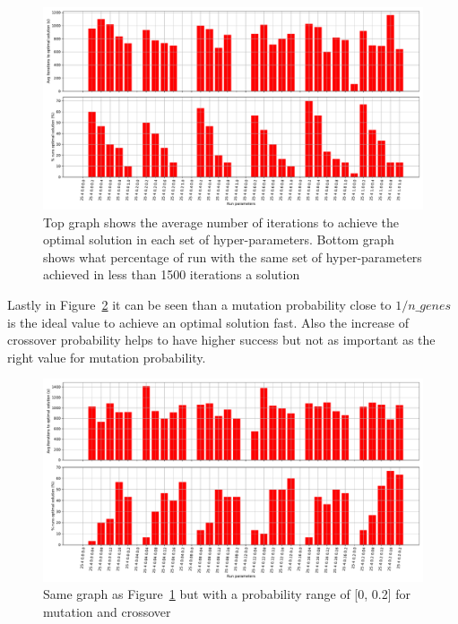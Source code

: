 \documentclass[12pt,oneside,a4paper]{article}
\begin{document}
    \begin{figure}[h]
        \includegraphics[width=\textwidth]{iters_to_optimal}
        \caption{Top graph shows the average number of iterations to achieve the optimal solution in each set of
        hyper-parameters.
        Bottom graph shows what percentage of run with the same set of hyper-parameters achieved in less than 1500
        iterations a solution}
        \label{fig:iters_to_optimal}
    \end{figure}


    Lastly in Figure~\ref{fig:iters_to_optimal_02} it can be seen than a mutation probability close to \(1/n\_genes\)
    is the ideal value to achieve an optimal solution fast.
    Also the increase of crossover probability helps to have higher success but not as important as the right value
    for mutation probability.

    \begin{figure}[h]
        \includegraphics[width=\textwidth]{iters_to_optimal_02}
        \caption{Same graph as Figure~\ref{fig:iters_to_optimal} but with a probability range of [0, 0.2] for
        mutation and crossover}
        \label{fig:iters_to_optimal_02}
    \end{figure}
\end{document}
